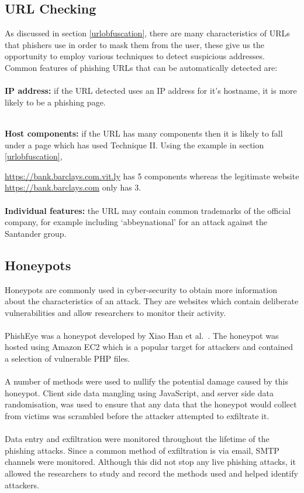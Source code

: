 \documentclass[12pt,twoside]{report}
\begin{document}
\subsection{URL Checking}
As discussed in section \ref{urlobfuscation}, there are many characteristics of URLs that phishers use in order to mask them from the user, these give us the opportunity to employ various techniques to detect suspicious addresses. Common features of phishing URLs that can be automatically detected are:
\\\\
\textbf{IP address:} if the URL detected uses an IP address for it's hostname, it is more likely to be a phishing page.
\\\\
{\textbf{Host components:} if the URL has many components then it is likely to fall under a page which has used Technique II. Using the example in section \ref{urlobfuscation},\unskip\parfillskip 0pt \par} \noindent\url{https://bank.barclays.com.vit.ly} has 5 components whereas the legitimate website \url{https://bank.barclays.com} only has 3.
\\\\
\textbf{Individual features:} the URL may contain common trademarks of the official company, for example including `abbeynational' for an attack against the Santander group.
\subsection{Honeypots}
Honeypots are commonly used in cyber-security to obtain more information about the characteristics of an attack. They are websites which contain deliberate vulnerabilities and allow researchers to monitor their activity.
\\\\
PhishEye was a honeypot developed by Xiao Han et al.~\cite{phisheye}. The honeypot was hosted using Amazon EC2 which is a popular target for attackers and contained a selection of vulnerable PHP files.
\\\\
A number of methods were used to nullify the potential damage caused by this honeypot. Client side data mangling using JavaScript, and server side data randomisation, was used to ensure that any data that the honeypot would collect from victims was scrambled before the attacker attempted to exfiltrate it.
\\\\
Data entry and exfiltration were monitored throughout the lifetime of the phishing attacks. Since a common method of exfiltration is via email, SMTP channels were monitored. Although this did not stop any live phishing attacks, it allowed the researchers to study and record the methods used and helped identify attackers.
\end{document}
